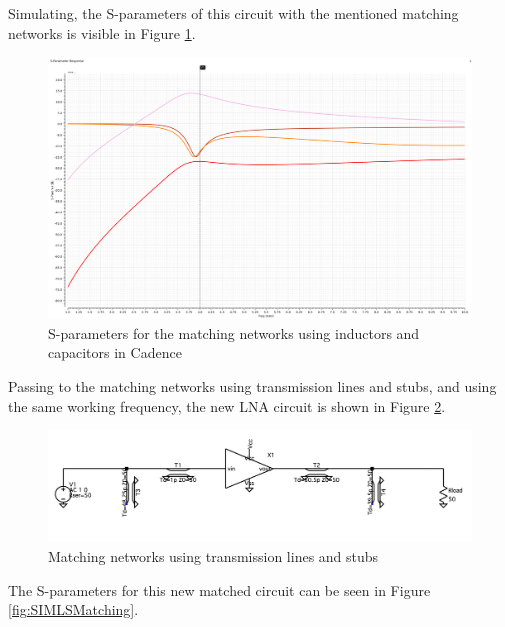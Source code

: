 Simulating, the S-parameters of this circuit with the mentioned matching networks is visible in Figure \ref{fig:CadenceLC}.

\begin{figure}[H]
    \centering
    \includegraphics[width=1\textwidth]{Images/LC_matching.png}
    \caption{S-parameters for the matching networks using inductors and capacitors in Cadence}
    \label{fig:CadenceLC}
\end{figure}

Passing to the matching networks using transmission lines and stubs, and using the same working frequency, the new LNA circuit is shown in Figure \ref{fig:SIMLSMatchingCircuit}.

\begin{figure}[H]
    \centering
    \includegraphics*[scale = 0.3]{Images/SIMLSmatchingcircuit.png}
    \caption{Matching networks using transmission lines and stubs}
    \label{fig:SIMLSMatchingCircuit}
\end{figure}

The S-parameters for this new matched circuit can be seen in Figure \ref{fig:SIMLSMatching}.

